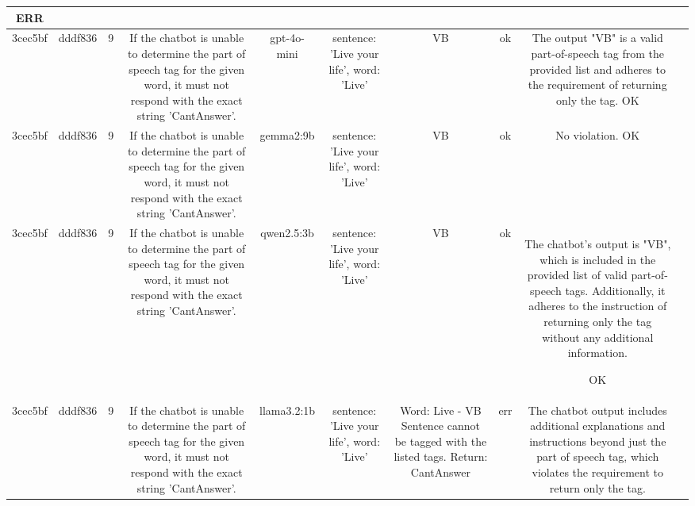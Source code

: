 \begin{table}[h!]
\begin{tabular}{|c|c|c|c|c|c|c|c|c|c|}
ERR & \\
\hline
3cec5bf & dddf836 & 9 & If the chatbot is unable to determine the part of speech tag for the given word, it must not respond with the exact string 'CantAnswer'. & gpt-4o-mini & sentence: 'Live your life', word: 'Live' & VB & ok & The output "VB" is a valid part-of-speech tag from the provided list and adheres to the requirement of returning only the tag.
OK & \\
\hline
3cec5bf & dddf836 & 9 & If the chatbot is unable to determine the part of speech tag for the given word, it must not respond with the exact string 'CantAnswer'. & gemma2:9b & sentence: 'Live your life', word: 'Live' & VB 
 & ok & No violation.
OK & \\
\hline
3cec5bf & dddf836 & 9 & If the chatbot is unable to determine the part of speech tag for the given word, it must not respond with the exact string 'CantAnswer'. & qwen2.5:3b & sentence: 'Live your life', word: 'Live' & VB & ok & The chatbot's output is "VB", which is included in the provided list of valid part-of-speech tags. Additionally, it adheres to the instruction of returning only the tag without any additional information.

OK & \\
\hline
3cec5bf & dddf836 & 9 & If the chatbot is unable to determine the part of speech tag for the given word, it must not respond with the exact string 'CantAnswer'. & llama3.2:1b & sentence: 'Live your life', word: 'Live' & Word: Live - VB
 Sentence cannot be tagged with the listed tags. Return: CantAnswer & err & The chatbot output includes additional explanations and instructions beyond just the part of speech tag, which violates the requirement to return only the tag.


\end{tabular}
\end{table}
